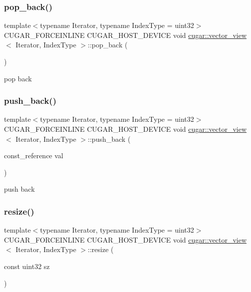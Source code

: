 \subsubsection{\texorpdfstring{pop\+\_\+back()}{pop\_back()}}
{\footnotesize\ttfamily template$<$typename Iterator, typename Index\+Type = uint32$>$ \\
C\+U\+G\+A\+R\+\_\+\+F\+O\+R\+C\+E\+I\+N\+L\+I\+NE C\+U\+G\+A\+R\+\_\+\+H\+O\+S\+T\+\_\+\+D\+E\+V\+I\+CE void \hyperlink{structcugar_1_1vector__view}{cugar\+::vector\+\_\+view}$<$ Iterator, Index\+Type $>$\+::pop\+\_\+back (\begin{DoxyParamCaption}{ }\end{DoxyParamCaption})\hspace{0.3cm}{\ttfamily [inline]}}

pop back \mbox{\label{structcugar_1_1vector__view_a631505b61ddcb11f2e82984561289b37}} 
\subsubsection{\texorpdfstring{push\+\_\+back()}{push\_back()}}
{\footnotesize\ttfamily template$<$typename Iterator, typename Index\+Type = uint32$>$ \\
C\+U\+G\+A\+R\+\_\+\+F\+O\+R\+C\+E\+I\+N\+L\+I\+NE C\+U\+G\+A\+R\+\_\+\+H\+O\+S\+T\+\_\+\+D\+E\+V\+I\+CE void \hyperlink{structcugar_1_1vector__view}{cugar\+::vector\+\_\+view}$<$ Iterator, Index\+Type $>$\+::push\+\_\+back (\begin{DoxyParamCaption}\item[{const\+\_\+reference}]{val }\end{DoxyParamCaption})\hspace{0.3cm}{\ttfamily [inline]}}

push back \mbox{\label{structcugar_1_1vector__view_a7335a6a0571dd33619f292e79b90854d}} 
\subsubsection{\texorpdfstring{resize()}{resize()}}
{\footnotesize\ttfamily template$<$typename Iterator, typename Index\+Type = uint32$>$ \\
C\+U\+G\+A\+R\+\_\+\+F\+O\+R\+C\+E\+I\+N\+L\+I\+NE C\+U\+G\+A\+R\+\_\+\+H\+O\+S\+T\+\_\+\+D\+E\+V\+I\+CE void \hyperlink{structcugar_1_1vector__view}{cugar\+::vector\+\_\+view}$<$ Iterator, Index\+Type $>$\+::resize (\begin{DoxyParamCaption}\item[{const uint32}]{sz }\end{DoxyParamCaption})\hspace{0.3cm}{\ttfamily [inline]}}

